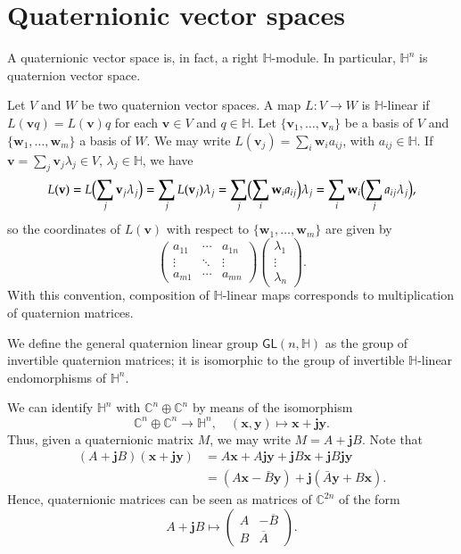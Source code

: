 \documentclass[12pt, a4paper]{amsart}
\newcommand{\C}{\mathbb{C}}
\renewcommand{\H}{\mathbb{H}}
\theoremstyle{remark}
\begin{document}
\section{Quaternionic vector spaces}\label{sec:vector-spaces}

A quaternionic vector space is, in fact, a right $\H$-module.
In particular, $\H^n$ is quaternion vector space.

Let $V$ and $W$ be two quaternion vector spaces. 
A map $L\colon V\to W$ is $\H$-linear if $L(\mathbf{v}q)=L(\mathbf{v})q$ for each $\mathbf{v}\in V$ and $q\in\H$. Let $\{\mathbf{v}_1,\dots,\mathbf{v}_n\}$ be a basis of $V$ and $\{\mathbf{w}_1,\dots,\mathbf{w}_m\}$ a basis of $W$. 
We may write $L(\mathbf{v}_j)=\sum_i \mathbf{w}_i a_{ij}$, with $a_{ij}\in\H$. 
If $\mathbf{v}=\sum_j \mathbf{v}_j\lambda_j\in V$, $\lambda_j\in\H$, we have 
\[
L(\mathbf{v})
=L\Bigl(\sum_j \mathbf{v}_j\lambda_j\Bigr)
=\sum_j L(\mathbf{v}_j)\lambda_j{}=\sum_j\Bigl(\sum_i \mathbf{w}_i a_{ij}\Bigr)\lambda_j
=\sum_{i}\mathbf{w}_i\Bigl(\sum_j a_{ij}\lambda_j\Bigr),
\]
so the coordinates of $L(\mathbf{v})$ with respect to $\{\mathbf{w}_1,\dots,\mathbf{w}_m\}$ are given by
\[
\begin{pmatrix}
a_{11} & \cdots & a_{1n}\\
\vdots & \ddots & \vdots\\
a_{m1} & \cdots & a_{mn}
\end{pmatrix}
\begin{pmatrix}
\lambda_1\\
\vdots\\
\lambda_n
\end{pmatrix}.
\]
With this convention, composition of $\H$-linear maps corresponds to multiplication of quaternion matrices.

We define the general quaternion linear group $\mathsf{GL}(n,\H)$ as the group of invertible quaternion matrices; it is isomorphic to the group of invertible $\H$-linear endomorphisms of $\H^n$. 

We can identify $\H^n$ with $\C^n\oplus\C^n$ by means of the isomorphism
\[
\C^n\oplus\C^n\to\H^n,\quad (\mathbf{x},\mathbf{y})\mapsto \mathbf{x}+\mathbf{j}\mathbf{y}.
\]
Thus, given a quaternionic matrix $M$, we may write $M=A+\mathbf{j}B$.
Note that
\[
\begin{aligned}
(A+\mathbf{j}B)(\mathbf{x}+\mathbf{j}\mathbf{y})
&{}=A\mathbf{x}+A\mathbf{j}\mathbf{y}
+\mathbf{j}B\mathbf{x}+\mathbf{j}B\mathbf{j}\mathbf{y}\\
&{}=(A\mathbf{x}-\bar{B}\mathbf{y})
+\mathbf{j}(\bar{A}\mathbf{y}+B\mathbf{x}).
\end{aligned}
\]
Hence, quaternionic matrices can be seen as matrices of $\C^{2n}$ of the form
\[
A+\mathbf{j}B\mapsto
\begin{pmatrix}
A & -\overline{B}\\
B & \overline{A}
\end{pmatrix}.
\]
\end{document}
